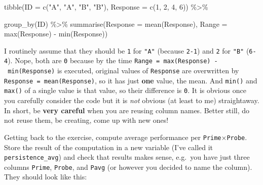 \documentclass[
]{book}
\newenvironment{Shaded}{\begin{snugshade}}{\end{snugshade}}
\newcommand{\AttributeTok}[1]{\textcolor[rgb]{0.77,0.63,0.00}{#1}}
\newcommand{\DecValTok}[1]{\textcolor[rgb]{0.00,0.00,0.81}{#1}}
\newcommand{\FunctionTok}[1]{\textcolor[rgb]{0.00,0.00,0.00}{#1}}
\newcommand{\NormalTok}[1]{#1}
\newcommand{\SpecialCharTok}[1]{\textcolor[rgb]{0.00,0.00,0.00}{#1}}
\newcommand{\StringTok}[1]{\textcolor[rgb]{0.31,0.60,0.02}{#1}}
\begin{document}
\begin{Shaded}
\begin{Highlighting}[]
\FunctionTok{tibble}\NormalTok{(}\AttributeTok{ID =} \FunctionTok{c}\NormalTok{(}\StringTok{"A"}\NormalTok{, }\StringTok{"A"}\NormalTok{, }\StringTok{"B"}\NormalTok{, }\StringTok{"B"}\NormalTok{),}
       \AttributeTok{Response =} \FunctionTok{c}\NormalTok{(}\DecValTok{1}\NormalTok{, }\DecValTok{2}\NormalTok{, }\DecValTok{4}\NormalTok{, }\DecValTok{6}\NormalTok{)) }\SpecialCharTok{\%\textgreater{}\%}
  
  \FunctionTok{group\_by}\NormalTok{(ID) }\SpecialCharTok{\%\textgreater{}\%}
  \FunctionTok{summarise}\NormalTok{(}\AttributeTok{Response =} \FunctionTok{mean}\NormalTok{(Response),}
            \AttributeTok{Range =} \FunctionTok{max}\NormalTok{(Response) }\SpecialCharTok{{-}} \FunctionTok{min}\NormalTok{(Response))}
\end{Highlighting}
\end{Shaded}

I routinely assume that they should be \texttt{1} for \texttt{"A"} (because \texttt{2-1}) and \texttt{2} for \texttt{"B"} (\texttt{6-4}). Nope, both are \texttt{0} because by the time \texttt{Range\ =\ max(Response)\ -\ min(Response)} is executed, original values of \texttt{Response} are overwritten by \texttt{Response\ =\ mean(Response)}, so it has just \textbf{one} value, the mean. And \texttt{min()} and \texttt{max()} of a single value is that value, so their difference is \texttt{0}. It is obvious once you carefully consider the code but it is \emph{not} obvious (at least to me) straightaway. In short, be \textbf{very careful} when you are reusing column names. Better still, do not reuse them, be creating, come up with new ones!

Getting back to the exercise, compute average performance per \texttt{Prime}×\texttt{Probe}. Store the result of the computation in a new variable (I've called it \texttt{persistence\_avg}) and check that results makes sense, e.g.~you have just three columns \texttt{Prime}, \texttt{Probe}, and \texttt{Pavg} (or however you decided to name the column). They should look like this:
\end{document}
